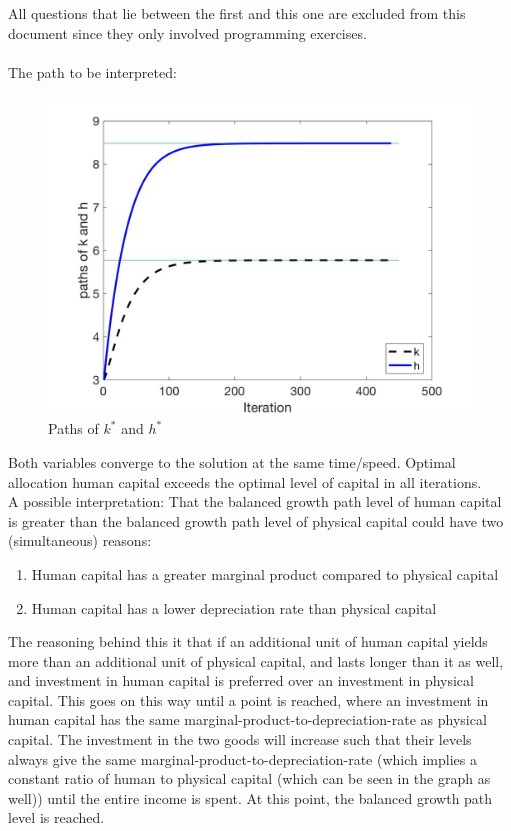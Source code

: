 \documentclass{article}
\begin{document}
 \subsection{}
 All questions that lie between the first and this one are excluded from this document since they only involved programming exercises. \\ \\
 The path to be interpreted:
 \begin{figure}[H]
\includegraphics[width=\textwidth,height=\textheight,keepaspectratio, center]{PS3Q3.jpg} 
\caption{Paths of $k^*$ and $h^*$}
\end{figure}
\noindent Both variables converge to the solution at the same time/speed. Optimal allocation human capital exceeds the optimal level of capital in all iterations.\\ A possible interpretation: That the balanced growth path level of human capital is greater than the balanced growth path level of physical capital could have two (simultaneous) reasons:
\begin{enumerate}
\item Human capital has a greater marginal product compared to physical capital
\item Human capital has a lower depreciation rate than physical capital
\end{enumerate}
The reasoning behind this it that if an additional unit of human capital yields more than an additional unit of physical capital, and lasts longer than it as well, and investment in human capital is preferred over an investment in physical capital. This goes on this way until a point is reached, where an investment in human capital has the same marginal-product-to-depreciation-rate as physical capital. The investment in the two goods will increase such that their levels always give the same marginal-product-to-depreciation-rate (which implies a constant ratio of human to physical capital (which can be seen in the graph as well)) until the entire income is spent. At this point, the balanced growth path level is reached.
\end{document}

